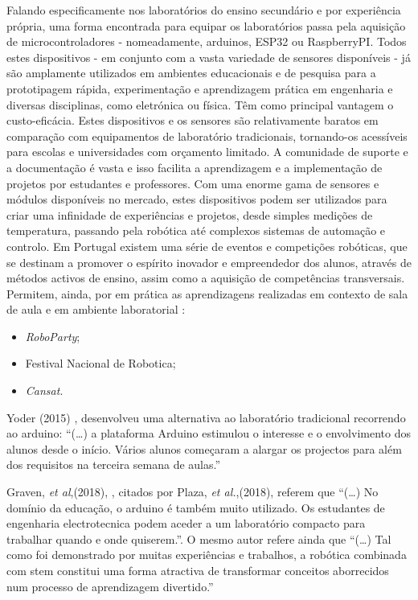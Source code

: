 Falando especificamente nos laboratórios do ensino secundário e por experiência própria, uma forma encontrada para equipar os laboratórios passa pela aquisição de \acrfull{microcontroladores} -  nomeadamente, \gls{arduino}s, \gls{ESP32} ou \gls{RaspberryPI}. Todos estes dispositivos - em conjunto com a vasta variedade de sensores disponíveis - já são amplamente utilizados em ambientes educacionais e de pesquisa para a prototipagem rápida, experimentação e aprendizagem prática em engenharia e diversas disciplinas, como eletrónica ou física. Têm como principal vantagem o custo-eficácia. Estes dispositivos e os sensores são relativamente baratos em comparação com equipamentos de laboratório tradicionais, tornando-os acessíveis para escolas e universidades com orçamento limitado. A comunidade de suporte e a documentação é vasta e isso facilita a aprendizagem e a implementação de projetos por estudantes e professores. Com uma enorme gama de sensores e módulos disponíveis no mercado, estes dispositivos podem ser utilizados para criar uma infinidade de experiências e projetos, desde simples medições de temperatura, passando pela robótica até complexos sistemas de automação e controlo.
Em Portugal existem uma série de eventos e competições robóticas, que se destinam a promover o espírito inovador e empreendedor dos alunos, através de métodos activos de ensino, assim como a aquisição de competências transversais. Permitem, ainda, por em prática as aprendizagens realizadas em contexto de sala de aula e em ambiente laboratorial \cite{roboparty}\cite{fnr}\cite{cansat}:
\begin{itemize}
    \item \textit{RoboParty};
    \item Festival Nacional de Robotica;
    \item \textit{Cansat}.
\end{itemize}

Yoder (2015) \cite{yoder}, desenvolveu uma alternativa ao laboratório tradicional recorrendo ao \gls{arduino}: ``(\dots) a plataforma Arduino estimulou o interesse e o envolvimento dos alunos desde o início. Vários alunos começaram a alargar os projectos para além dos requisitos na terceira semana de aulas.''

Graven, \textit{et al},(2018), \cite{graven}, citados por Plaza, \textit{et al.},(2018), \cite{plaza} referem que ``(\ldots) No domínio da educação, o \gls{arduino} é também muito utilizado. Os estudantes de engenharia electrotecnica podem aceder a um laboratório compacto para trabalhar quando e onde quiserem.''. O mesmo autor refere ainda que ``(\ldots) Tal como foi demonstrado por muitas experiências e trabalhos, a robótica combinada com \acrshort{stem} constitui uma forma atractiva de transformar conceitos aborrecidos num processo de aprendizagem divertido.''

